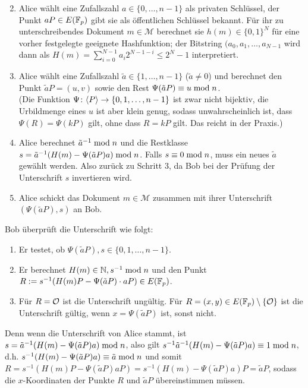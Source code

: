 \begin{anw}
	\begin{enumerate}[(1)]
		\setcounter{enumi}{1}
		\item Alice wählt eine Zufallszahl $a \in \{0,\dots,n-1\}$ als privaten Schlüssel, der Punkt $aP \in E(\mathbb{F}_p)$ gibt sie als öffentlichen Schlüssel bekannt.
		Für ihr zu unterschreibendes Dokument $m \in \mathcal{M}$ berechnet sie $h(m) \in \{0,1\}^N$ für eine vorher festgelegte geeignete Hashfunktion; der Bitstring $(a_0,a_1,\dots,a_{N-1}$ wird dann als $H(m) = \sum_{i=0}^{N-1} a_i 2^{N-1-i} \leq 2^N-1$ interpretiert.
		\item Alice wählt eine Zufallszahl $\tilde{a} \in \{1,\dots,n-1\}$ ($\tilde{a} \neq 0$) und berechnet den Punkt $\tilde{a}P = (u,v)$ sowie den Rest $\Psi(\tilde{a}P) \equiv u \bmod n$. \\
		(Die Funktion $\Psi\colon \langle P\rangle \rightarrow \{0,1,\dots,n-1\}$ ist zwar nicht bijektiv, die Urbildmenge eines $u$ ist aber klein genug, sodass unwahrscheinlich ist, dass $\Psi(R) = \Psi(kP)$ gilt, ohne dass $R = kP$ gilt.
		Das reicht in der Praxis.)
		\item Alice berechnet $\tilde{a}^{-1} \bmod n$ und die Restklasse $s = \tilde{a}^{-1} (H(m) - \Psi(\tilde{a}P)a) \bmod n$.
		Falls $s \equiv 0 \bmod n$, muss ein neues $\tilde{a}$ gewählt werden. Also zurück zu Schritt 3, da Bob bei der Prüfung der Unterschrift $s$ invertieren wird.
		\item Alice schickt das Dokument $m \in \mathcal{M}$ zusammen mit ihrer Unterschrift $(\Psi(\tilde{a}P),s)$ an Bob.
	\end{enumerate}
\end{anw}

\begin{anw}[Verifikation]
	Bob überprüft die Unterschrift wie folgt:
	\begin{enumerate}[(1)]
		\item Er testet, ob $\Psi(\tilde{a}P), s \in \{0,1,\dots,n-1\}$.
		\item Er berechnet $H(m) \in \mathbb{N}, s^{-1} \bmod n$ und den Punkt $R := s^{-1} (H(m)P - \Psi(\tilde{a}P) \cdot aP) \in E(\mathbb{F}_p)$.
		\item Für $R = \mathcal{O}$ ist die Unterschrift ungültig. Für $R = (x,y) \in E(\mathbb{F}_p) \setminus \{\mathcal{O}\}$ ist die Unterschrift gültig, wenn $x = \Psi(\tilde{a}P)$ ist, sonst nicht.
	\end{enumerate}
\end{anw}

\begin{bem}
	Denn wenn die Unterschrift von Alice stammt, ist $s = \tilde{a}^{-1}(H(m)-\Psi(\tilde{a}P)a) \bmod n$, also gilt $s^{-1} \tilde{a}^{-1}(H(m) - \Psi(\tilde{a}P)a) \equiv 1 \bmod n$, d.h. $s^{-1}(H(m)-\Psi(\tilde{a}P)a) \equiv \tilde{a} \bmod n$ und somit $R = s^{-1}(H(m)P - \Psi(\tilde{a}P)aP) = s^{-1}(H(m)-\Psi(\tilde{a}P)a)P = \tilde{a} P$, sodass die $x$-Koordinaten der Punkte $R$ und $\tilde{a}P$ übereinstimmen müssen.
\end{bem}

